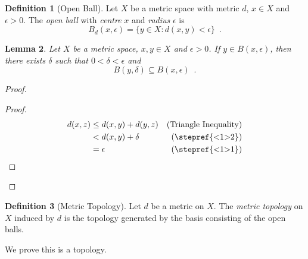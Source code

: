 \documentclass{report}
\let\qed\relax
\newtheorem{lm}{Lemma}[section]
\theoremstyle{definition}
\newtheorem{df}[lm]{Definition}
\begin{document}
  \begin{df}[Open Ball]
    Let $X$ be a metric space with metric $d$, $x \in X$ and $\epsilon > 0$.
    The \emph{open       ball} with \emph{centre} $x$ and \emph{radius}
    $\epsilon$
    is
    \[ B_d(x, \epsilon) = \{ y \in X : d(x, y) < \epsilon \} \enspace . \]
  \end{df}

  \begin{lm}
    \label{lm:topology:metric:balls}
    Let $X$ be a metric space, $x, y \in X$ and $\epsilon > 0$. If $y \in B(x,
    \epsilon)$, then there exists $\delta$ such that $0 < \delta < \epsilon$ and
    \[ B(y, \delta) \subseteq B(x, \epsilon) \enspace . \]
  \end{lm}

  \begin{proof}
    \pf
    \begin{proof}
      \pf
      \begin{align*}
        d(x, z) & \leq d(x, y) + d(y, z) & (\text{Triangle Inequality}) \\
        & < d(x, y) + \delta & (\text{\stepref{<1>2}}) \\
        & = \epsilon & (\text{\stepref{<1>1}})
      \end{align*}
    \end{proof}
    \qed
  \end{proof}

  \begin{df}[Metric Topology]
    Let $d$ be a metric on $X$. The \emph{metric topology} on $X$ induced by
    $d$ is the topology generated by the basis consisting of the open balls.

    We prove this is a topology.
  \end{df}
\end{document}
